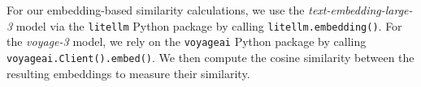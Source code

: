  For our embedding-based similarity calculations, we use the \textit{text-embedding-large-3} model via the \texttt{litellm} Python package by calling \texttt{litellm.embedding()}. For the \textit{voyage-3} model, we rely on the \texttt{voyageai} Python package by calling \texttt{voyageai.Client().embed()}. We then compute the cosine similarity between the resulting embeddings to measure their similarity.





